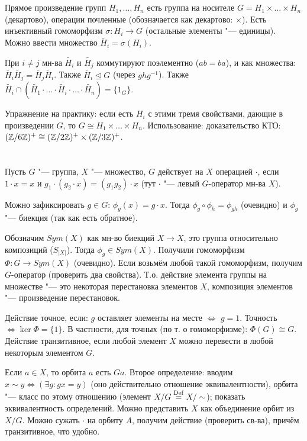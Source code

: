 \section{} %
Прямое произведение групп $H_1, \dots, H_n$ есть группа на носителе $G=H_1 \times \dots \times H_n$
(декартово), операции почленные (обозначается как декартово: $\times$).
Есть инъективный гомоморфизм $\sigma \colon H_i \to G$ (остальные элементы "--- единицы).
Можно ввести множество $\widetilde{H_i}=\sigma(H_i)$.

При $i \neq j$ мн-ва $\widetilde{H_i}$ и $\widetilde{H_j}$ коммутируют поэлементно ($ab=ba$),
и как множества: $\widetilde{H_i}\widetilde{H_j}=\widetilde{H_j}\widetilde{H_i}$.
Также $\widetilde{H_i} \unlhd G$ (через $ghg^{-1}$).
Также $\widetilde{H_i} \cap (\widetilde{H_1}\cdot \dots \cdot \overbar{\widetilde{H_i}} \cdot \dots \cdot \widetilde{H_n})=\{1_G\}$.

Упражнение на практику: если есть $H_i$ с этими тремя свойствами, дающие в произведении
$G$, то $G \cong H_1 \times \dots \times H_n$.
Использование: доказательство КТО: $(\mathbb{Z}/6\mathbb{Z})^+ \cong (\mathbb{Z}/2\mathbb{Z})^+ \times (\mathbb{Z}/3\mathbb{Z})^+$.

\section{} %
Пусть $G$ "--- группа, $X$ "--- множество, $G$ действует на $X$ операцией $\cdot$,
если $1\cdot x = x$ и $g_1\cdot(g_2 \cdot x)=(g_1g_2)\cdot x$ (тут $\cdot$ "--- левый
$G$-оператор мн-ва $X$).

Можно зафиксировать $g\in G$: $\phi_g(x) = g \cdot x$.
Тогда $\phi_g \circ \phi_h = \phi_{gh}$ (очевидно) и $\phi_g$ "--- биекция
(так как есть обратное).

Обозначим $Sym(X)$ как мн-во биекций $X \to X$, это группа относительно композиций ($S_{|X|}$).
Тогда $\phi_g \in Sym(X)$.
Получили гомоморфизм $\Phi \colon G \to Sym(X)$ (очевидно).
Если возьмём любой такой гомоморфизм, получим $G$-оператор
(проверить два свойства).
Т.о. действие элемента группы на множестве "--- это некоторая перестановка элементов $X$,
композиция элементов "--- произведение перестановок.

Действие точное, если: $g$ оставляет элементы на месте $\iff$ $g=1$.
Точность $\iff \ker \Phi =\{1\}$.
В частности, для точных (по т. о гомоморфизме): $\Phi(G) \cong G$.
Действие транзитивное, если любой элемент $X$ можно перевести в любой некоторым элементом $G$.

Если $a \in X$, то орбита $a$ есть $Ga$.
Второе определение: вводим $x \sim y \iff (\exists g \colon gx=y)$ (оно
действительно отношение эквивалентности), орбита "--- класс по этому отношению
(элемент $X/G \stackrel{\mathrm{Def}}{=} X/\sim$); показать эквивалентность определений.
Можно представить $X$ как объединение орбит из $X/G$.
Можно сужать $\cdot$ на орбиту $A$, получим действие (проверить св-ва),
причём транзитивное, что удобно.

